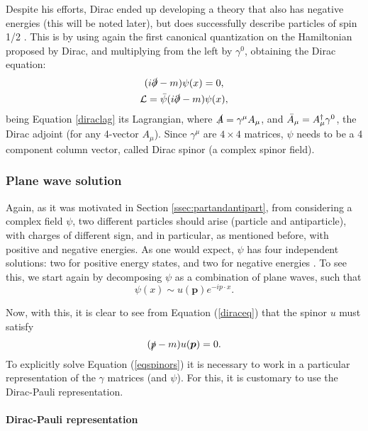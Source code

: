 Despite his efforts, Dirac ended up developing a theory that also has negative energies (this will be noted later), but does successfully describe particles of spin 1/2 \cite{Peskin}. This is by using again the first canonical quantization on the Hamiltonian proposed by Dirac, and multiplying from the left by $\gamma^0$, obtaining the Dirac equation:
\begin{gather}
    \label{diraceq}
    (i\slashed{\partial} - m)\psi(x) = 0, \\
    \label{diraclag}
    \mathcal{L} = \Bar{\psi}(i\slashed{\partial} - m)\psi(x),
\end{gather}
being Equation \ref{diraclag} its Lagrangian, where $\slashed{A} = \gamma^{\mu}A_{\mu}$, and $\Bar{A}_{\mu} = A^{\dagger}_{\mu}\gamma^0$, the Dirac adjoint (for any 4-vector $A_{\mu}$). Since $\gamma^{\mu}$ are $4\times4$ matrices, $\psi$ needs to be a 4 component column vector, called Dirac spinor (a complex spinor field). 

\subsubsection{Plane wave solution} \label{ssec:diracplanewavesol}

Again, as it was motivated in Section \ref{ssec:partandantipart}, from considering a complex field $\psi$, two different particles should arise (particle and antiparticle), with charges of different sign, and in particular, as mentioned before, with positive and negative energies. As one would expect, $\psi$ has four independent solutions: two for positive energy states, and two for negative energies \cite{Thomson}. To see this, we start again by decomposing $\psi$ as a combination of plane waves, such that
\begin{equation*}
\psi(x) \sim u(\bm{p})e^{-ip\cdot x}. 
\end{equation*}

Now, with this, it is clear to see from Equation (\ref{diraceq}) that the spinor $u$ must satisfy
\begin{equation}
\label{eqspinors}
    (\slashed{p} - m)u(\bm{p}) = 0.
\end{equation}
To explicitly solve Equation (\ref{eqspinors}) it is necessary to work in a particular representation of the $\gamma$ matrices (and $\psi$). For this, it is customary to use the Dirac-Pauli representation.

\paragraph{Dirac-Pauli representation} \label{ssec:diracpaulirep}

